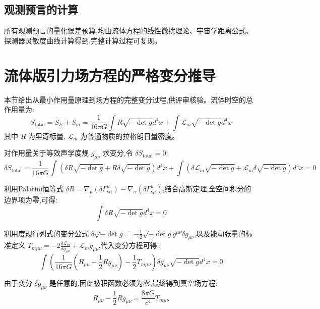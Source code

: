 \documentclass[11pt,a4paper]{article}
\begin{document}
\subsection{观测预言的计算}
\label{app:predictions}
所有观测预言的量化误差预算,均由流体方程的线性微扰理论、宇宙学距离公式、探测器灵敏度曲线计算得到,完整计算过程可复现。

\section{流体版引力场方程的严格变分推导}
\label{app:field_eq}
本节给出从最小作用量原理到场方程的完整变分过程,供评审核验。流体时空的总作用量为:
\begin{equation}
S_{\text{total}} = S_E + S_m = \frac{1}{16\pi G} \int R \sqrt{-\det g} d^4 x + \int \mathcal{L}_m \sqrt{-\det g} d^4 x
\end{equation}
其中 $R$ 为里奇标量, $\mathcal{L}_m$ 为普通物质的拉格朗日量密度。

对作用量关于等效声学度规 $g_{\mu\nu}$ 求变分,令 $\delta S_{\text{total}}=0$:
\begin{equation}
\delta S_{\text{total}} = \frac{1}{16\pi G} \int \left( \delta R \sqrt{-\det g} + R \delta \sqrt{-\det g} \right) d^4 x + \int \left( \delta \mathcal{L}_m \sqrt{-\det g} + \mathcal{L}_m \delta \sqrt{-\det g} \right) d^4 x = 0
\end{equation}

利用Palatini恒等式 $\delta R = \nabla_\mu(\delta \Gamma_{\nu\alpha}^\mu) - \nabla_\alpha(\delta \Gamma_{\nu\mu}^\mu)$,结合高斯定理,全空间积分的边界项为零,可得:
\begin{equation}
\int \delta R \sqrt{-\det g} d^4 x = 0
\end{equation}

利用度规行列式的变分公式 $\delta \sqrt{-\det g} = -\frac{1}{2} \sqrt{-\det g} g^{\mu\nu} \delta g_{\mu\nu}$,以及能动张量的标准定义 $T_{m\mu\nu} = -2 \frac{\delta \mathcal{L}_m}{\delta g_{\mu\nu}} + \mathcal{L}_m g_{\mu\nu}$,代入变分方程可得:
\begin{equation}
\int \left( \frac{1}{16\pi G} \left( R_{\mu\nu} - \frac{1}{2} R g_{\mu\nu} \right) - \frac{1}{2} T_{m\mu\nu} \right) \delta g_{\mu\nu} \sqrt{-\det g} d^4 x = 0
\end{equation}

由于变分 $\delta g_{\mu\nu}$ 是任意的,因此被积函数必须为零,最终得到真空场方程:
\begin{equation}
R_{\mu\nu} - \frac{1}{2} R g_{\mu\nu} = \frac{8\pi G}{c^4} T_{m\mu\nu}
\end{equation}
\end{document}

